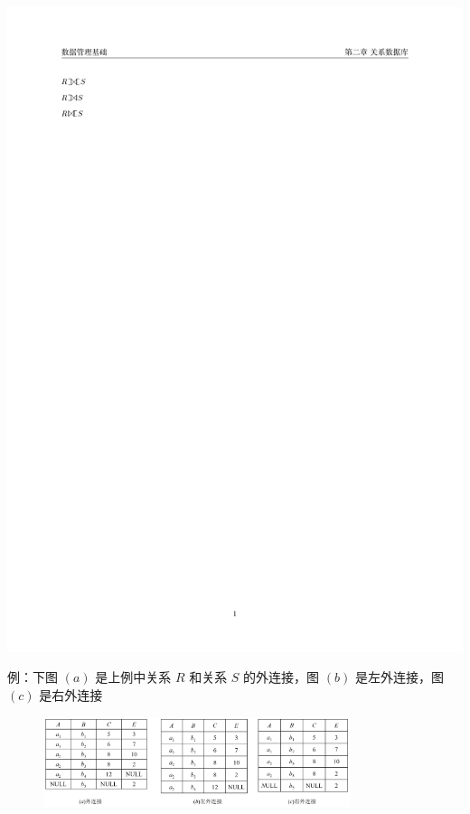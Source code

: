 \begin{itemize}
\begin{itemize}
        \includegraphics[scale=1]{images/right outer join.pdf}
    \end{itemize}
\end{itemize}

例：下图 $(a)$ 是上例中关系 $R$ 和关系 $S$ 的外连接，图 $(b)$ 是左外连接，图 $(c)$ 是右外连接
\begin{figure}[H]
    \vspace{-0.5em}
	\centering
	\includegraphics[width=0.8\textwidth]{images/2.3.3.3.2}
    \vspace{-1em}
\end{figure}

